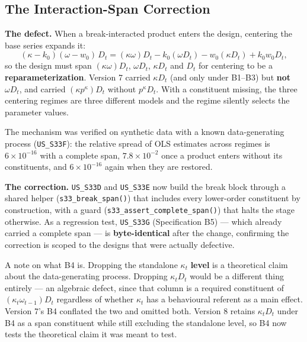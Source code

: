 \documentclass[11pt,a4paper]{article}
\begin{document}



\subsection{The Interaction-Span Correction}
\label{sec:specB_span}

\textbf{The defect.} When a break-interacted product enters the design, centering the base series expands it:
\begin{equation}
(\kappa - k_0)(\omega - w_0)\, D_t = (\kappa\omega) D_t - k_0 (\omega D_t) - w_0 (\kappa D_t) + k_0 w_0 D_t,
\end{equation}
so the design must span $(\kappa\omega)D_t$, $\omega D_t$, $\kappa D_t$ and $D_t$ for centering to be a \textbf{reparameterization}. Version 7 carried $\kappa D_t$ (and only under B1--B3) but \textbf{not $\omega D_t$}, and carried $(\kappa p^{\kappa})D_t$ without $p^{\kappa} D_t$. With a constituent missing, the three centering regimes are three different models and the regime silently selects the parameter values.

The mechanism was verified on synthetic data with a known data-generating process (\texttt{US\_S33F}): the relative spread of OLS estimates across regimes is $6\times10^{-16}$ with a complete span, $7.8\times10^{-2}$ once a product enters without its constituents, and $6\times10^{-16}$ again when they are restored.

\textbf{The correction.} \texttt{US\_S33D} and \texttt{US\_S33E} now build the break block through a shared helper (\texttt{s33\_break\_span()}) that includes every lower-order constituent by construction, with a guard (\texttt{s33\_assert\_complete\_span()}) that halts the stage otherwise. As a regression test, \texttt{US\_S33G} (Specification B5) --- which already carried a complete span --- is \textbf{byte-identical} after the change, confirming the correction is scoped to the designs that were actually defective.

A note on what B4 is. Dropping the standalone $\kappa_t$ \textbf{level} is a theoretical claim about the data-generating process. Dropping $\kappa_t D_t$ would be a different thing entirely --- an algebraic defect, since that column is a required constituent of $(\kappa_t\omega_{t-1})D_t$ regardless of whether $\kappa_t$ has a behavioural referent as a main effect. Version 7's B4 conflated the two and omitted both. Version 8 retains $\kappa_t D_t$ under B4 as a span constituent while still excluding the standalone level, so B4 now tests the theoretical claim it was meant to test.
\end{document}
